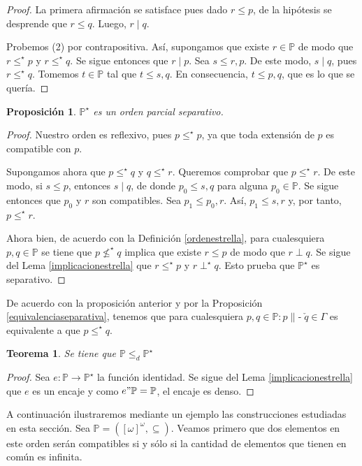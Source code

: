 \documentclass[11pt]{unam_tesis1}
\theoremstyle{MyThmStyle}
\theoremstyle{definition}
\theoremstyle{plain}
\newtheorem{theorem}[definition]{Teorema}
\newtheorem{proposition}[definition]{Proposici\'on}
\theoremstyle{remark}
\def\forces{\mathop{\parallel\!\!\!-}\nolimits}
\let\Vdash\forces
\let\leq\leqslant
\begin{document}
\begin{proof}
La primera afirmaci\'on se satisface pues dado $r\leq p$, de la hip\'otesis se desprende que $r\leq q$. Luego, $r\mid q$.

Probemos (2) por contrapositiva. As\'i, supongamos que existe $r\in \mathbb P$ de modo que $r\leq^\star p$ y $r\leq^\star q$. Se sigue entonces que $r\mid p$. Sea $s\leq r,p$. De este modo, $s\mid q$, pues $r\leq^\star q$. Tomemos $t\in \mathbb P$ tal que $t\leq s,q$. En consecuencia, $t\leq p,q$, que es lo que se quer\'ia.
\end{proof}

\begin{proposition}
$\mathbb P^\star$ es un orden parcial separativo.
\end{proposition}

\begin{proof}
Nuestro orden es reflexivo, pues $p\leq^\star p$, ya que toda extensi\'on de $p$ es compatible con $p$.

Supongamos ahora que $p\leq^\star q$ y $q\leq^\star r$. Queremos comprobar que $p \leq^\star r$. De este modo, si $s\leq p$, entonces $s\mid q$, de donde $p_0\leq s,q$ para alguna $p_0\in \mathbb P$. Se sigue entonces que $p_0$ y $r$ son compatibles. Sea $p_1\leq p_0,r$. As\'i, $p_1\leq s,r$ y, por tanto, $p\leq^\star r$.

Ahora bien, de acuerdo con la Definici\'on \ref{ordenestrella}, para cualesquiera $p,q\in \mathbb P$ se tiene que $p\nleq^\star q$ implica que existe $r\leq p$ de modo que $r\perp q$. Se sigue del Lema \ref{implicacionestrella} que $r\leq^\star p$ y $r\perp^\star q$. Esto prueba que $\mathbb P^\star$ es separativo.
\end{proof}


De acuerdo con la proposici\'on anterior y por la Proposici\'on \ref{equivalenciaseparativa}, tenemos que para cualesquiera $p,q \in \mathbb P: p \Vdash \check q\in\Gamma$ es equivalente a que $p \leq^\star q$.
\newpage
\begin{theorem}
Se tiene que $\mathbb P\leq_d \mathbb P^\star$
\end{theorem}

\begin{proof}
Sea $e:\mathbb P\to \mathbb P^\star$ la funci\'on identidad. Se sigue del Lema \ref{implicacionestrella} que $e$ es un encaje y como $e"\mathbb P=\mathbb P$, el encaje es denso.
\end{proof}


A continuaci\'on ilustraremos mediante un ejemplo las construcciones estudiadas en esta secci\'on. Sea $\mathbb P=([\omega]^\omega,\subseteq)$. Veamos primero que dos elementos en este orden ser\'an com\-pa\-ti\-bles si y s\'olo si la cantidad de elementos que tienen en com\'un es infinita.
\end{document}
